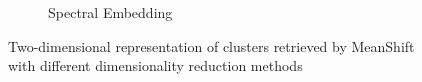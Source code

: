 \begin{figure}
\begin{subfigure}{.3\textwidth}
    \caption{Spectral Embedding}
    \label{fig:mean_shift_spectral}
  \end{subfigure}
  \caption{Two-dimensional representation of clusters retrieved by MeanShift with different dimensionality reduction methods}
  \label{fig:mean_shift}
\end{figure}